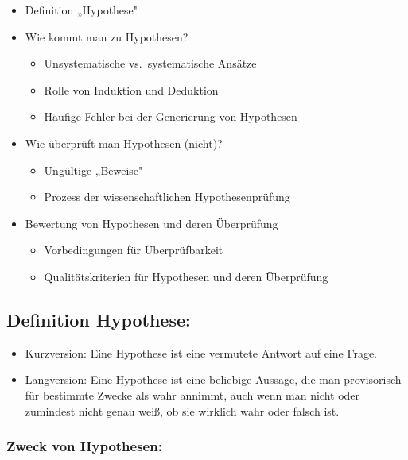 \documentclass[
]{book}
\providecommand{\tightlist}{%
  \setlength{\itemsep}{0pt}\setlength{\parskip}{0pt}}
\begin{document}
\begin{itemize}
\item
  Definition „Hypothese"
\item
  Wie kommt man zu Hypothesen?

  \begin{itemize}
  \tightlist
  \item
    Unsystematische vs.~systematische Ansätze
  \item
    Rolle von Induktion und Deduktion
  \item
    Häufige Fehler bei der Generierung von Hypothesen
  \end{itemize}
\item
  Wie überprüft man Hypothesen (nicht)?

  \begin{itemize}
  \tightlist
  \item
    Ungültige „Beweise"
  \item
    Prozess der wissenschaftlichen Hypothesenprüfung
  \end{itemize}
\item
  Bewertung von Hypothesen und deren Überprüfung

  \begin{itemize}
  \tightlist
  \item
    Vorbedingungen für Überprüfbarkeit
  \item
    Qualitätskriterien für Hypothesen und deren Überprüfung
  \end{itemize}
\end{itemize}

\hypertarget{definition-hypothese}{%
\subsection{Definition Hypothese:}\label{definition-hypothese}}

\begin{itemize}
\tightlist
\item
  Kurzversion: Eine Hypothese ist eine vermutete Antwort auf eine Frage.
\item
  Langversion: Eine Hypothese ist eine beliebige Aussage, die man provisorisch für bestimmte Zwecke als wahr annimmt, auch wenn man nicht oder zumindest nicht genau weiß, ob sie wirklich wahr oder falsch ist.
\end{itemize}

\hypertarget{zweck-von-hypothesen}{%
\subsubsection{Zweck von Hypothesen:}\label{zweck-von-hypothesen}}
\end{document}
